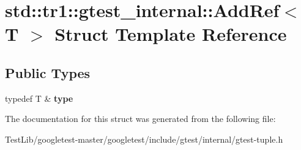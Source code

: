 \hypertarget{structstd_1_1tr1_1_1gtest__internal_1_1AddRef}{}\section{std\+:\+:tr1\+:\+:gtest\+\_\+internal\+:\+:Add\+Ref$<$ T $>$ Struct Template Reference}
\label{structstd_1_1tr1_1_1gtest__internal_1_1AddRef}
\subsection*{Public Types}
\begin{DoxyCompactItemize}
\item 
\mbox{\label{structstd_1_1tr1_1_1gtest__internal_1_1AddRef_a1e5616e414125574c1653e3a1fc68491}} 
typedef T \& {\bfseries type}
\end{DoxyCompactItemize}


The documentation for this struct was generated from the following file\+:\begin{DoxyCompactItemize}
\item 
Test\+Lib/googletest-\/master/googletest/include/gtest/internal/gtest-\/tuple.\+h\end{DoxyCompactItemize}
